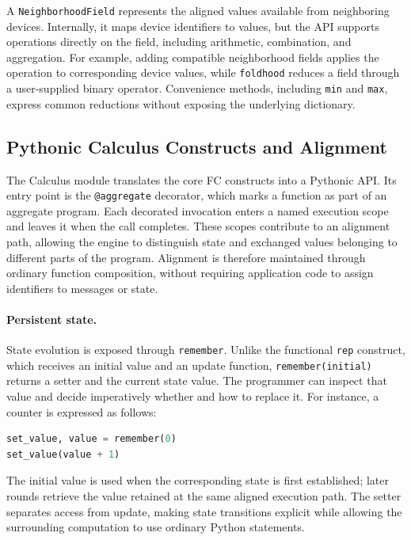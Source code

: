 A \texttt{NeighborhoodField} represents the aligned values available from
 neighboring devices.
%
Internally, it maps device identifiers to values, but the API supports
 operations directly on the field, including arithmetic, combination, and
 aggregation.
%
For example, adding compatible neighborhood fields applies the operation
 to corresponding device values, while \texttt{foldhood} reduces a field
 through a user-supplied binary operator.
%
Convenience methods, including \texttt{min} and \texttt{max}, express common
 reductions without exposing the underlying dictionary.

\subsection{Pythonic Calculus Constructs and Alignment}
\label{sec:phyelds-calculus}

The Calculus module translates the core \gls{FC} constructs into a Pythonic API.
%
Its entry point is the \texttt{@aggregate} decorator, which marks a function
 as part of an aggregate program.
%
Each decorated invocation enters a named execution scope and leaves it when
 the call completes.
%
These scopes contribute to an alignment path, allowing the engine to
 distinguish state and exchanged values belonging to different parts of the program.
%
Alignment is therefore maintained through ordinary function composition,
 without requiring application code to assign identifiers to messages or state.

\paragraph{Persistent state.}
State evolution is exposed through \texttt{remember}.
%
Unlike the functional \texttt{rep} construct, which receives an initial
 value and an update function, \texttt{remember(initial)} returns a setter
 and the current state value.
%
The programmer can inspect that value and decide imperatively whether and
 how to replace it.
%
For instance, a counter is expressed as follows:

\begin{lstlisting}[language=Python,breaklines=true,
  caption={Imperative update of persistent state.},
  label={lst:phyelds-remember}]
set_value, value = remember(0)
set_value(value + 1)
\end{lstlisting}

The initial value is used when the corresponding state is first established;
 later rounds retrieve the value retained at the same aligned execution path.
%
The setter separates access from update, making state transitions explicit
 while allowing the surrounding computation to use ordinary Python statements.

